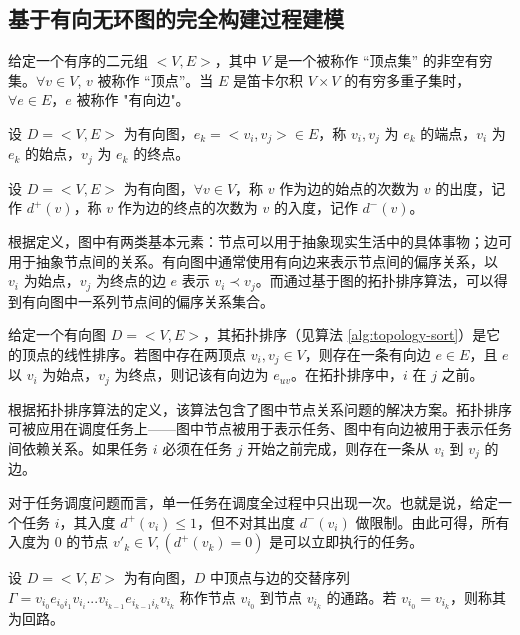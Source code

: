 \subsection{基于有向无环图的完全构建过程建模}

\begin{dfn}
    给定一个有序的二元组 $<V, E>$，其中 $V$ 是一个被称作 “顶点集” 的非空有穷集。$\forall v \in V$, $v$ 被称作 “顶点”。当 $E$ 是笛卡尔积 $V \times V$ 的有穷多重子集时，$\forall e \in E$，$e$ 被称作 "有向边"。\cite{DISCRETEMATH}
\end{dfn}

\begin{dfn}
    设 $D = <V, E>$ 为有向图，$e_k = <v_i, v_j> \in E$，称 $v_i, v_j$ 为 $e_k$ 的端点，$v_i$ 为 $e_k$ 的始点，$v_j$ 为 $e_k$ 的终点。\cite{DISCRETEMATH}
\end{dfn}

\begin{dfn}
    设 $D = <V, E>$ 为有向图，$\forall v \in V$，称 $v$ 作为边的始点的次数为 $v$ 的出度，记作 $d^+(v)$，称 $v$ 作为边的终点的次数为 $v$ 的入度，记作 $d^-(v)$。
\end{dfn}

根据定义，图中有两类基本元素：节点可以用于抽象现实生活中的具体事物；边可用于抽象节点间的关系。有向图中通常使用有向边来表示节点间的偏序关系，以 $v_i$ 为始点，$v_j$ 为终点的边 $e$ 表示 $v_i \prec v_j$。而通过基于图的拓扑排序算法，可以得到有向图中一系列节点间的偏序关系集合。

\begin{dfn}
    给定一个有向图 $D = <V, E>$，其拓扑排序（见算法 \ref{alg:topology-sort}）是它的顶点的线性排序。若图中存在两顶点 $v_i, v_j \in V$，则存在一条有向边 $e \in E$，且 $e$ 以 $v_i$ 为始点，$v_j$ 为终点，则记该有向边为 $e_{u v}$。在拓扑排序中，$i$ 在 $j$ 之前。
\end{dfn}

根据拓扑排序算法的定义，该算法包含了图中节点关系问题的解决方案。拓扑排序可被应用在调度任务上——图中节点被用于表示任务、图中有向边被用于表示任务间依赖关系。如果任务 $i$ 必须在任务 $j$ 开始之前完成，则存在一条从 $v_i$ 到 $v_j$ 的边。

对于任务调度问题而言，单一任务在调度全过程中只出现一次。也就是说，给定一个任务 $i$，其入度 $d^+(v_i) \le 1$，但不对其出度 $d^-(v_i)$ 做限制。由此可得，所有入度为 0 的节点 ${v'}_k \in V, (d^+(v_k) = 0)$ 是可以立即执行的任务。

\begin{dfn}
    设 $D = <V, E>$ 为有向图，$D$ 中顶点与边的交替序列 $\varGamma = v_{i_0} e_{i_0 i_1} v_{i_i} ... v_{i_{k-1}} e_{i_{k-1} i_k} v_{i_k}$ 称作节点 $v_{i_0}$ 到节点 $v_{i_k}$ 的通路。若 $v_{i_0} = v_{i_k}$，则称其为回路。
\end{dfn}

